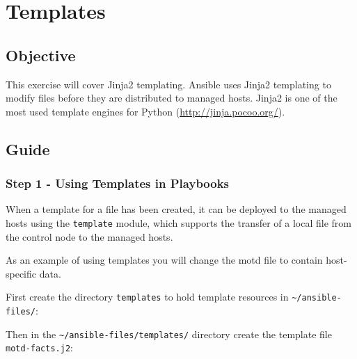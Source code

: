 \hypertarget{templates}{%
\section{Templates}\label{templates}}

\hypertarget{objective}{%
\subsection{Objective}\label{objective}}

This exercise will cover Jinja2 templating. Ansible uses Jinja2
templating to modify files before they are distributed to managed hosts.
Jinja2 is one of the most used template engines for Python
(\url{http://jinja.pocoo.org/}).

\hypertarget{guide}{%
\subsection{Guide}\label{guide}}

\hypertarget{step-1---using-templates-in-playbooks}{%
\subsubsection{Step 1 - Using Templates in
Playbooks}\label{step-1---using-templates-in-playbooks}}

When a template for a file has been created, it can be deployed to the
managed hosts using the \texttt{template} module, which supports the
transfer of a local file from the control node to the managed hosts.

As an example of using templates you will change the motd file to
contain host-specific data.

First create the directory \texttt{templates} to hold template resources
in \texttt{\textasciitilde{}/ansible-files/}:

\begin{Shaded}
\begin{Highlighting}[]
\ExtensionTok{[student@controller}\NormalTok{ ansible{-}files]$ mkdir templates}
\end{Highlighting}
\end{Shaded}

Then in the \texttt{\textasciitilde{}/ansible-files/templates/}
directory create the template file \texttt{motd-facts.j2}:

\begin{Shaded}
\begin{Highlighting}[]
\end{Highlighting}
\end{Shaded}


